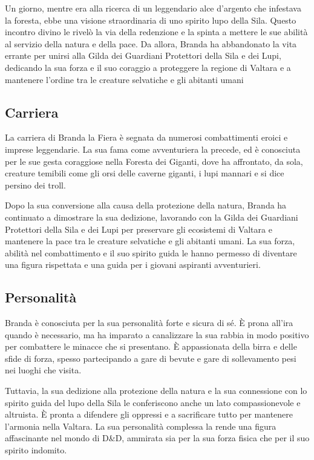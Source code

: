 Un giorno, mentre era alla ricerca di un leggendario alce d'argento che
infestava la foresta, ebbe una visione straordinaria di uno spirito lupo
della Sila. Questo incontro divino le rivelò la via della redenzione e
la spinta a mettere le sue abilità al servizio della natura e della
pace. Da allora, Branda ha abbandonato la vita errante per unirsi alla
Gilda dei Guardiani Protettori della Sila e dei Lupi, dedicando la sua
forza e il suo coraggio a proteggere la regione di Valtara e a mantenere
l'ordine tra le creature selvatiche e gli abitanti umani

\subsection{Carriera}\label{carriera}


La carriera di Branda la Fiera è segnata da numerosi combattimenti
eroici e imprese leggendarie. La sua fama come avventuriera la precede,
ed è conosciuta per le sue gesta coraggiose nella Foresta dei Giganti,
dove ha affrontato, da sola, creature temibili come gli orsi delle
caverne giganti, i lupi mannari e si dice persino dei troll.

Dopo la sua conversione alla causa della protezione della natura, Branda
ha continuato a dimostrare la sua dedizione, lavorando con la Gilda dei
Guardiani Protettori della Sila e dei Lupi per preservare gli ecosistemi
di Valtara e mantenere la pace tra le creature selvatiche e gli abitanti
umani. La sua forza, abilità nel combattimento e il suo spirito guida le
hanno permesso di diventare una figura rispettata e una guida per i
giovani aspiranti avventurieri.

\subsection{Personalità}\label{personalituxe0}


Branda è conosciuta per la sua personalità forte e sicura di sé. È prona
all'ira quando è necessario, ma ha imparato a canalizzare la sua rabbia
in modo positivo per combattere le minacce che si presentano. È
appassionata della birra e delle sfide di forza, spesso partecipando a
gare di bevute e gare di sollevamento pesi nei luoghi che visita.

Tuttavia, la sua dedizione alla protezione della natura e la sua
connessione con lo spirito guida del lupo della Sila le conferiscono
anche un lato compassionevole e altruista. È pronta a difendere gli
oppressi e a sacrificare tutto per mantenere l'armonia nella Valtara. La
sua personalità complessa la rende una figura affascinante nel mondo di
D\&D, ammirata sia per la sua forza fisica che per il suo spirito
indomito.

